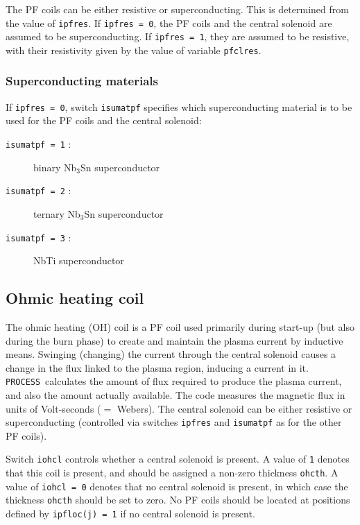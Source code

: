 \documentclass[11pt,a4paper]{report}
\newcommand{\process}{\mbox{\texttt{PROCESS}}}
\begin{document}
The PF coils can be either resistive or superconducting. This is determined
from the value of \texttt{ipfres}. If \texttt{ipfres = 0}, the PF coils and
the central solenoid are assumed to be superconducting. If \texttt{ipfres = 1},
they are assumed to be resistive, with their resistivity given by the value of
variable \texttt{pfclres}.

\subsubsection{Superconducting materials}

If \texttt{ipfres = 0}, switch \texttt{isumatpf} specifies which
superconducting material is to be used for the PF coils and the central
solenoid:
\begin{description}
\item [\texttt{isumatpf = 1} :] binary Nb$_3$Sn superconductor
\item [\texttt{isumatpf = 2} :] ternary Nb$_3$Sn superconductor
\item [\texttt{isumatpf = 3} :] NbTi superconductor
\end{description}

\subsection{Ohmic heating coil}
\label{sec:ohcoil}

The ohmic heating (OH) coil is a PF coil used primarily during start-up (but
also during the burn phase) to create and maintain the plasma current by
inductive means. Swinging (changing) the current through the central solenoid
causes a change in the flux linked to the plasma region, inducing a current in
it. \process\ calculates the amount of flux required to produce the plasma
current, and also the amount actually available. The code measures the
magnetic flux in units of Volt-seconds ($=$ Webers). The central solenoid can
be either resistive or superconducting (controlled via switches
\texttt{ipfres} and \texttt{isumatpf} as for the other PF coils).

Switch \texttt{iohcl} controls whether a central solenoid is present. A value
of \texttt{1} denotes that this coil is present, and should be assigned a
non-zero thickness \texttt{ohcth}. A value of \texttt{iohcl = 0} denotes that
no central solenoid is present, in which case the thickness \texttt{ohcth}
should be set to zero. No PF coils should be located at positions defined by
\texttt{ipfloc(j) = 1} if no central solenoid is present.
\end{document}
